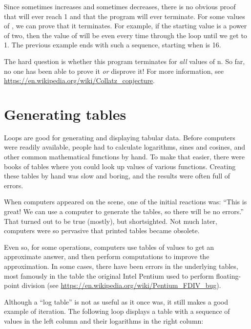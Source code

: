 Since  sometimes increases and sometimes decreases, there is no obvious proof that  will ever reach 1 and that the program will ever terminate.
For some values of , we can prove that it terminates.
For example, if the starting value is a power of two, then the value of  will be even every time through the loop until we get to 1.
The previous example ends with such a sequence, starting when  is 16.

The hard question is whether this program terminates for {\em all} values of n.
So far, no one has been able to prove it {\em or} disprove it!
For more information, see \url{https://en.wikipedia.org/wiki/Collatz_conjecture}.


\section{Generating tables}


Loops are good for generating and displaying tabular data.
Before computers were readily available, people had to calculate logarithms, sines and cosines, and other common mathematical functions by hand.
To make that easier, there were books of tables where you could look up values of various functions.
Creating these tables by hand was slow and boring, and the results were often full of errors.

When computers appeared on the scene, one of the initial reactions was: ``This is great!
We can use a computer to generate the tables, so there will be no errors.''
That turned out to be true (mostly), but shortsighted.
Not much later, computers were so pervasive that printed tables became obsolete.


Even so, for some operations, computers use tables of values to get an approximate answer, and then perform computations to improve the approximation.
In some cases, there have been errors in the underlying tables, most famously in the table the original Intel Pentium used to perform floating-point division (see \url{https://en.wikipedia.org/wiki/Pentium_FDIV_bug}).

Although a ``log table'' is not as useful as it once was, it still makes a good example of iteration.
The following loop displays a table with a sequence of values in the left column and their logarithms in the right column:

